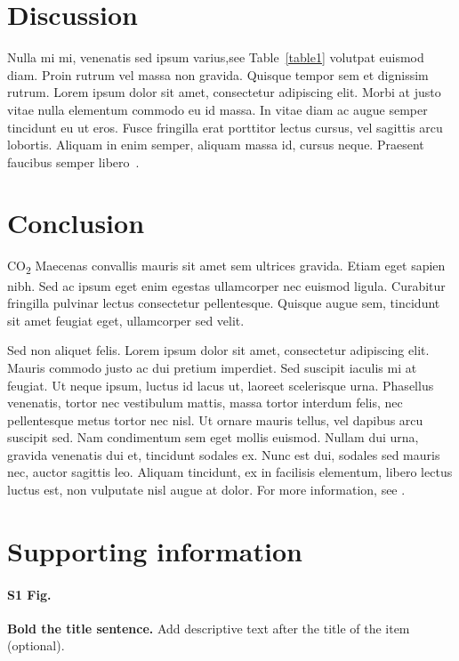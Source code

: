 \documentclass[
  10pt,
  letterpaper,
]{article}
\begin{document}
\section{Discussion}\label{discussion}

Nulla mi mi, venenatis sed ipsum varius,see Table~\ref{table1} volutpat
euismod diam. Proin rutrum vel massa non gravida. Quisque tempor sem et
dignissim rutrum. Lorem ipsum dolor sit amet, consectetur adipiscing
elit. Morbi at justo vitae nulla elementum commodo eu id massa. In vitae
diam ac augue semper tincidunt eu ut eros. Fusce fringilla erat
porttitor lectus cursus, vel sagittis arcu lobortis. Aliquam in enim
semper, aliquam massa id, cursus neque. Praesent faucibus semper
libero~\citep{bib3}.

\section{Conclusion}\label{conclusion}

CO\textsubscript{2} Maecenas convallis mauris sit amet sem ultrices
gravida. Etiam eget sapien nibh. Sed ac ipsum eget enim egestas
ullamcorper nec euismod ligula. Curabitur fringilla pulvinar lectus
consectetur pellentesque. Quisque augue sem, tincidunt sit amet feugiat
eget, ullamcorper sed velit.

Sed non aliquet felis. Lorem ipsum dolor sit amet, consectetur
adipiscing elit. Mauris commodo justo ac dui pretium imperdiet. Sed
suscipit iaculis mi at feugiat. Ut neque ipsum, luctus id lacus ut,
laoreet scelerisque urna. Phasellus venenatis, tortor nec vestibulum
mattis, massa tortor interdum felis, nec pellentesque metus tortor nec
nisl. Ut ornare mauris tellus, vel dapibus arcu suscipit sed. Nam
condimentum sem eget mollis euismod. Nullam dui urna, gravida venenatis
dui et, tincidunt sodales ex. Nunc est dui, sodales sed mauris nec,
auctor sagittis leo. Aliquam tincidunt, ex in facilisis elementum,
libero lectus luctus est, non vulputate nisl augue at dolor. For more
information, see .

\section{Supporting information}\label{supporting-information}

\paragraph*{S1 Fig.}
\label{s1-fig}
{\textbf{Bold the title sentence.}} Add descriptive text after the title
of the item (optional).
\end{document}
